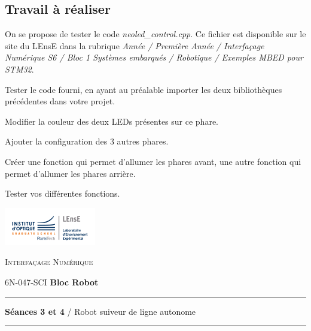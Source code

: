 \documentclass[a4paper,11pt,titlepage]{article} %
\begin{document}
\newpage
\subsection{Travail à réaliser}

On se propose de tester le code \textsl{neoled\_control.cpp}. Ce fichier est disponible sur le site du LEnsE dans la rubrique \textit{Année / Première Année / Interfaçage Numérique S6 / Bloc 1 Systèmes embarqués / Robotique / Exemples MBED pour STM32}.

\Manip Tester le code fourni, en ayant au préalable importer les deux bibliothèques précédentes dans votre projet.

\Manip Modifier la couleur des deux LEDs présentes sur ce phare.

\Manip Ajouter la configuration des 3 autres phares.

\Manip Créer une fonction qui permet d'allumer les phares avant, une autre fonction qui permet d'allumer les phares arrière.

\Manip Tester vos différentes fonctions.


\newpage
\strut %
\begin{minipage}[c]{.25\linewidth}
	\includegraphics[width=4cm]{images/Logo-LEnsE.png}
\end{minipage} \hfill
\begin{minipage}[c]{.4\linewidth}

\begin{center}
\vspace{0.3cm}
{\Large \textsc{Interfaçage Numérique}}

\medskip

6N-047-SCI \qquad \textbf{\Large Bloc Robot}

\end{center}
\end{minipage}\hfill

\vspace{0.5cm}

\noindent \rule{\linewidth}{1pt}

{\noindent\Large \rule[-7pt]{0pt}{30pt} \textbf{Séances 3 et 4} / Robot suiveur de ligne autonome} 

\noindent \rule{\linewidth}{1pt}
\end{document}

